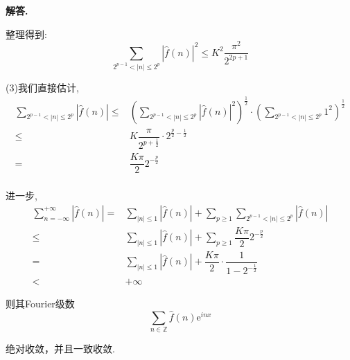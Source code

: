 \documentclass[12pt, a4paper, oneside]{ctexart}
\newenvironment{solution}{\par\noindent\textbf{解答. }}{\par}
\begin{document}
\begin{solution}
$$$$
\par
整理得到:
$$
\sum_{2^{p-1}<|n|\leqslant 2^p}\left|\hat{f}(n)\right|^2
    \leqslant  K^2\dfrac{\pi^2}{2^{2p+1}}
$$
\par
(3)我们直接估计,
$$
\begin{aligned}
\sum_{2^{p-1}<|n|\leqslant 2^p}\left|\hat{f}(n)\right|
    \leqslant & \left(\sum_{2^{p-1}<|n|\leqslant 
    2^p}\left|\hat{f}(n)\right|^2\right)^{\frac{1}{2}}
    \cdot \left(\sum_{2^{p-1}<|n|\leqslant 2^p}1^2\right)^{\frac{1}{2}}\\
    \leqslant & K\dfrac{\pi}{2^{p+\frac{1}{2}}}\cdot 2^{\frac{p}{2}-\frac{1}{2}}\\
    = & \dfrac{K\pi}{2}{2^{-\frac{p}{2}}}\\
\end{aligned}
$$
\par
进一步,
$$
\begin{aligned}
\sum_{n=-\infty}^{+\infty}\left|\hat{f}(n)\right|
=&\sum_{|n|\leqslant 1}\left|\hat{f}(n)\right|
+\sum_{p\geqslant 1}\sum_{2^{p-1}<|n|\leqslant 2^p}\left|\hat{f}(n)\right|\\
\leqslant & \sum_{|n|\leqslant 1}\left|\hat{f}(n)\right|
+ \sum_{p\geqslant 1} \dfrac{K\pi}{2}2^{-\frac{p}{2}}\\
=& \sum_{|n|\leqslant 1}\left|\hat{f}(n)\right|
+ \dfrac{K\pi}{2}\cdot \dfrac{1}{1-2^{-\frac{1}{2}}}\\
<&+\infty
\end{aligned}
$$
\par
则其Fourier级数
$$
\sum_{n \in \mathbb{Z}} \hat{f}(n)\mathrm{e}^{inx}
$$
\par
绝对收敛，并且一致收敛.


\end{solution}
\end{document}

